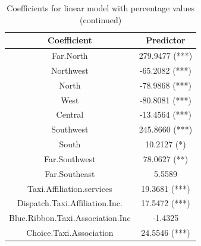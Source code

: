 \documentclass[twoside,11pt]{article}
\begin{document}
\begin{table}[H]
    \centering
    \begin{tabular}{c|c}
        Coefficient & Predictor \\ 
        \hline
        \hline
        Far.North & 279.9477 (***) \\
        Northwest & -65.2082 (***) \\
        North  & -78.9868 (***) \\
        West & -80.8081 (***) \\
        Central & -13.4564 (***) \\
        Southwest & 245.8660 (***) \\
        South & 10.2127 (*) \\
        Far.Southwest & 78.0627 (**) \\
        Far.Southeast & 5.5589 \\
        Taxi.Affiliation.services & 19.3681 (***) \\
        Dispatch.Taxi.Affiliation.Inc. & 17.5472 (***) \\
        Blue.Ribbon.Taxi.Association.Inc & -1.4325 \\
        Choice.Taxi.Association & 24.5546 (***) \\
    \end{tabular}
    \caption{Coefficients for linear model with percentage values (continued)}
    \label{tab:coefficients_perc2}
\end{table}
\end{document}
